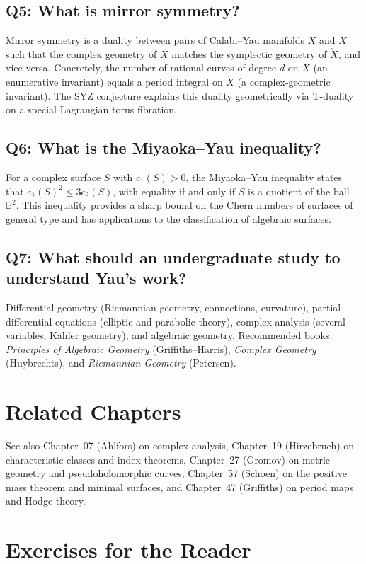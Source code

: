 \subsection*{Q5: What is mirror symmetry?}
Mirror symmetry is a duality between pairs of Calabi--Yau manifolds $X$ and $\check X$ such that the complex geometry of $X$ matches the symplectic geometry of $\check X$, and vice versa. Concretely, the number of rational curves of degree $d$ on $X$ (an enumerative invariant) equals a period integral on $\check X$ (a complex-geometric invariant). The SYZ conjecture explains this duality geometrically via T-duality on a special Lagrangian torus fibration.

\subsection*{Q6: What is the Miyaoka--Yau inequality?}
For a complex surface $S$ with $c_1(S) > 0$, the Miyaoka--Yau inequality states that $c_1(S)^2 \leq 3 c_2(S)$, with equality if and only if $S$ is a quotient of the ball $\mathbb{B}^2$. This inequality provides a sharp bound on the Chern numbers of surfaces of general type and has applications to the classification of algebraic surfaces.

\subsection*{Q7: What should an undergraduate study to understand Yau's work?}
Differential geometry (Riemannian geometry, connections, curvature), partial differential equations (elliptic and parabolic theory), complex analysis (several variables, K\"ahler geometry), and algebraic geometry. Recommended books: \textit{Principles of Algebraic Geometry} (Griffiths--Harris), \textit{Complex Geometry} (Huybrechts), and \textit{Riemannian Geometry} (Petersen).

\section{Related Chapters}
See also Chapter~07 (Ahlfors) on complex analysis, Chapter~19 (Hirzebruch) on characteristic classes and index theorems, Chapter~27 (Gromov) on metric geometry and pseudoholomorphic curves, Chapter~57 (Schoen) on the positive mass theorem and minimal surfaces, and Chapter~47 (Griffiths) on period maps and Hodge theory.

\section*{Exercises for the Reader}

